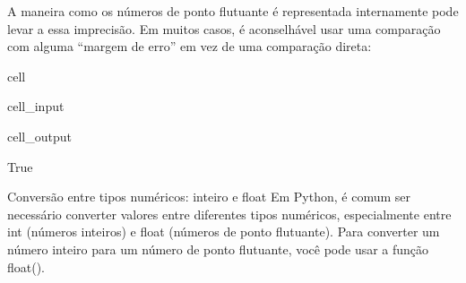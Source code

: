 \documentclass[letterpaper,10pt,english]{jupyterBook}
\begin{document}
\sphinxAtStartPar
A maneira como os números de ponto flutuante é representada internamente pode levar a essa imprecisão. Em muitos casos, é aconselhável usar uma comparação com alguma “margem de erro” em vez de uma comparação direta:

\begin{sphinxuseclass}{cell}\begin{sphinxVerbatimInput}

\begin{sphinxuseclass}{cell_input}
\begin{sphinxVerbatim}[commandchars=\\\{\}]
  
      
\end{sphinxVerbatim}

\end{sphinxuseclass}\end{sphinxVerbatimInput}
\begin{sphinxVerbatimOutput}

\begin{sphinxuseclass}{cell_output}
\begin{sphinxVerbatim}[commandchars=\\\{\}]
True
\end{sphinxVerbatim}

\end{sphinxuseclass}\end{sphinxVerbatimOutput}

\end{sphinxuseclass}
\sphinxAtStartPar
Conversão entre tipos numéricos: inteiro e float
Em Python, é comum ser necessário converter valores entre diferentes tipos numéricos, especialmente entre int (números inteiros) e float (números de ponto flutuante). Para converter um número inteiro para um número de ponto flutuante, você pode usar a função float().
\end{document}
